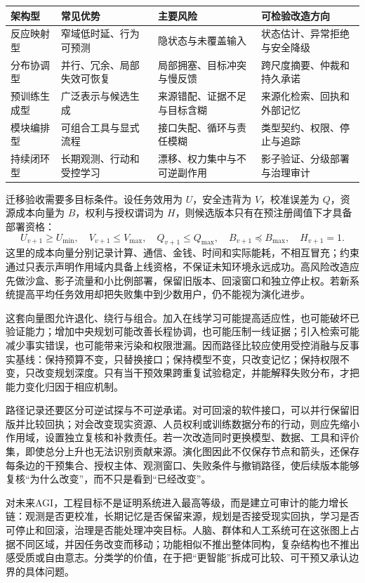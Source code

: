 \begin{table}[htbp]
\centering
\begin{tabularx}{\textwidth}{l X X X}
\toprule
\rowcolor{structurecolor!20} 架构型 & 常见优势 & 主要风险 & 可检验改造方向 \\
\midrule
反应映射型 & 窄域低时延、行为可预测 & 隐状态与未覆盖输入 & 状态估计、异常拒绝与安全降级 \\
分布协调型 & 并行、冗余、局部失效可恢复 & 局部拥塞、目标冲突与慢反馈 & 跨尺度摘要、仲裁和持久承诺 \\
预训练生成型 & 广泛表示与候选生成 & 来源错配、证据不足与目标含糊 & 来源化检索、回执和外部记忆 \\
模块编排型 & 可组合工具与显式流程 & 接口失配、循环与责任模糊 & 类型契约、权限、停止与追踪 \\
持续闭环型 & 长期观测、行动和受控学习 & 漂移、权力集中与不可逆副作用 & 影子验证、分级部署与治理审计 \\
\bottomrule
\end{tabularx}
\end{table}

迁移验收需要多目标条件。设任务效用为 $U$，安全违背为 $V$，校准误差为 $Q$，资源成本向量为 $B$，权利与授权谓词为 $H$，则候选版本只有在预注册阈值下才具备部署资格：
\begin{equation}
 U_{v+1}\ge U_{\min},\quad V_{v+1}\le V_{\max},\quad Q_{v+1}\le Q_{\max},\quad B_{v+1}\preceq B_{\max},\quad H_{v+1}=1.
\end{equation}
这里的成本向量分别记录计算、通信、金钱、时间和实际能耗，不相互冒充；约束通过只表示声明作用域内具备上线资格，不保证未知环境永远成功。高风险改造应先做沙盒、影子流量和小比例部署，保留旧版本、回滚窗口和独立停止权。若新系统提高平均任务效用却把失败集中到少数用户，仍不能视为演化进步。

这套向量图允许退化、绕行与组合。加入在线学习可能提高适应性，也可能破坏已验证能力；增加中央规划可能改善长程协调，也可能压制一线证据；引入检索可能减少事实错误，也可能带来污染和权限泄漏。因而路径比较应使用受控消融与反事实基线：保持预算不变，只替换接口；保持模型不变，只改变记忆；保持权限不变，只改变规划深度。只有当干预效果跨重复试验稳定，并能解释失败分布，才把能力变化归因于相应机制。

路径记录还要区分可逆试探与不可逆承诺。对可回滚的软件接口，可以并行保留旧版并比较回执；对会改变现实资源、人员权利或训练数据分布的行动，则应先缩小作用域，设置独立复核和补救责任。若一次改造同时更换模型、数据、工具和评价集，即使总分上升也无法识别贡献来源。演化图因此不仅保存节点和箭头，还保存每条边的干预集合、授权主体、观测窗口、失败条件与撤销路径，使后续版本能够复核“为什么改变”，而不只是看到“已经改变”。

对未来AGI，工程目标不是证明系统进入最高等级，而是建立可审计的能力增长链：观测是否更校准，长期记忆是否保留来源，规划是否接受现实回执，学习是否可停止和回滚，治理是否能处理冲突目标。人脑、群体和人工系统可在这张图上占据不同区域，并因任务改变而移动；功能相似不推出整体同构，复杂结构也不推出感受质或自由意志。分类学的价值，在于把“更智能”拆成可比较、可干预又承认边界的具体问题。

